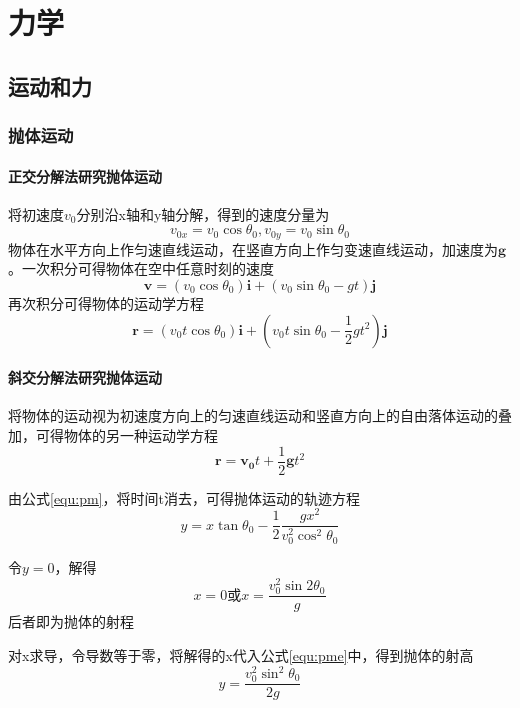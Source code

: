 \part{力学}
\chapter{运动和力}
\section{抛体运动}
\subsection{正交分解法研究抛体运动}
将初速度$v_0$分别沿x轴和y轴分解，得到的速度分量为
\[
v_{0x}=v_0\cos\theta_0,v_{0y}=v_0\sin\theta_0
\]
物体在水平方向上作匀速直线运动，在竖直方向上作匀变速直线运动，加速度为$\mathbf{g}$。一次积分可得物体在空中任意时刻的速度
$$
\bm{v}=(v_0\cos\theta_0)\bm{i}+(v_0\sin\theta_0-gt)\bm{j}
$$
再次积分可得物体的运动学方程
\begin{equation}
    \bm{r}=(v_0t\cos\theta_0)\bm{i}+\left(v_0t\sin\theta_0-\dfrac{1}{2}gt^2\right)\bm{j}
    \label{equ:pm}
\end{equation}

\subsection{斜交分解法研究抛体运动}
将物体的运动视为初速度方向上的匀速直线运动和竖直方向上的自由落体运动的叠加，可得物体的另一种运动学方程
$$
\bm{r}=\bm{v_0}t+\dfrac{1}{2}\bm{g}t^2
$$

由公式\ref{equ:pm}，将时间t消去，可得抛体运动的轨迹方程
\begin{equation}
    y=x\tan\theta_0-\dfrac{1}{2}\dfrac{gx^2}{v_0^2\cos^2\theta_0}
    \label{equ:pme}
\end{equation}

令$y=0$，解得
$$
x=0 \text{或}x=\dfrac{v_0^2\sin2\theta_0}{g}
$$
后者即为抛体的射程

对x求导，令导数等于零，将解得的x代入公式\ref{equ:pme}中，得到抛体的射高
$$
y=\dfrac{v_0^2\sin^2\theta_0}{2g}
$$
